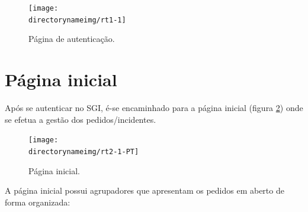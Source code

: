 
\begin{figure}[H]
\begin{center}
\texttt{[image: \\directorynameimg/rt1-1]}
\end{center}
\caption{Página de autenticação.}
\label{fig:rt1}
\end{figure}

\section{Página inicial}
Após se autenticar no SGI, é-se encaminhado para a página inicial (figura \ref{fig:rt2}) onde se efetua a gestão dos pedidos/incidentes.

\begin{figure}[H]
\begin{center}
\texttt{[image: \\directorynameimg/rt2-1-PT]}
\end{center}
\caption{Página inicial.}
\label{fig:rt2}
\end{figure}

A página inicial possui agrupadores que apresentam os pedidos em aberto de forma organizada:

